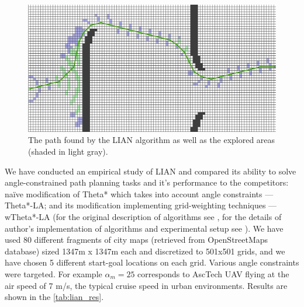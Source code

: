 \documentclass[review]{elsarticle}
\begin{document}
\begin{figure}[h]
	\centering
		\includegraphics[width=\textwidth]{path.jpg}
	\caption{The path found by the LIAN algorithm as well as the explored areas (shaded in light gray).}
	\label{fig:grid}	
\end{figure}

We have conducted an empirical study of LIAN and compared its ability to solve angle-constrained path planning tasks and it’s performance to the competitors: naïve modification of Theta* which takes into account angle constraints --- Theta*-LA; and its modification implementing grid-weighting techniques --- wTheta*-LA (for the original description of algorithms see \cite{Kim2014}, for the details of author’s implementation of algorithms and experimental setup see \cite{Yakovlev2015b}). We have used 80 different fragments of city maps (retrieved from OpenStreetMaps \cite{OpenStreet} database) sized 1347m x 1347m each and discretized to 501x501 grids, and we have chosen 5 different start-goal locations on each grid. Various angle constraints were targeted. For example $\alpha_m=25$ corresponds to AscTech UAV flying at the air speed of 7 m/s, the typical cruise speed in urban environments. Results are shown in the \autoref{tab:lian_res}.

\begin{table}
	\caption{Comparative study of LIAN, Theta*-LA and wTheta*-LA path planning algorithms.}	
	\label{tab:lian_res}\scriptsize
\end{table}
\end{document}
